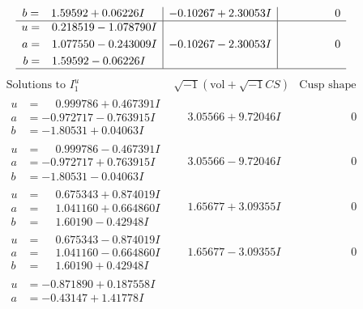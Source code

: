 \documentclass[1p]{elsarticle_modified}
\theoremstyle{definition}
\newcommand{\I}{\sqrt{-1}}
\begin{document}
$$\begin{array}{c|c|c}
\begin{aligned}
b &= \phantom{-}1.59592 + 0.06226 I\end{aligned}
 & -0.10267 + 2.30053 I & \phantom{-0.000000 } 0 \\ \hline\begin{aligned}
u &= \phantom{-}0.218519 - 1.078790 I \\
a &= \phantom{-}1.077550 - 0.243009 I \\
b &= \phantom{-}1.59592 - 0.06226 I\end{aligned}
 & -0.10267 - 2.30053 I & \phantom{-0.000000 } 0\\
 \hline 
 \end{array}$$\newpage$$\begin{array}{c|c|c}  
\text{Solutions to }I^u_{1}& \I (\text{vol} + \sqrt{-1}CS) & \text{Cusp shape}\\
 \hline 
\begin{aligned}
u &= \phantom{-}0.999786 + 0.467391 I \\
a &= -0.972717 - 0.763915 I \\
b &= -1.80531 + 0.04063 I\end{aligned}
 & \phantom{-}3.05566 + 9.72046 I & \phantom{-0.000000 } 0 \\ \hline\begin{aligned}
u &= \phantom{-}0.999786 - 0.467391 I \\
a &= -0.972717 + 0.763915 I \\
b &= -1.80531 - 0.04063 I\end{aligned}
 & \phantom{-}3.05566 - 9.72046 I & \phantom{-0.000000 } 0 \\ \hline\begin{aligned}
u &= \phantom{-}0.675343 + 0.874019 I \\
a &= \phantom{-}1.041160 + 0.664860 I \\
b &= \phantom{-}1.60190 - 0.42948 I\end{aligned}
 & \phantom{-}1.65677 + 3.09355 I & \phantom{-0.000000 } 0 \\ \hline\begin{aligned}
u &= \phantom{-}0.675343 - 0.874019 I \\
a &= \phantom{-}1.041160 - 0.664860 I \\
b &= \phantom{-}1.60190 + 0.42948 I\end{aligned}
 & \phantom{-}1.65677 - 3.09355 I & \phantom{-0.000000 } 0 \\ \hline\begin{aligned}
u &= -0.871890 + 0.187558 I \\
a &= -0.43147 + 1.41778 I \\

\end{aligned}
\end{array}$$
\end{document}
